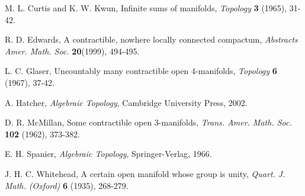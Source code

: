 \documentclass[12pt]{amsart}%
\theoremstyle{plain}
\numberwithin{equation}{section}
\begin{document}
\begin{thebibliography}{50}      

M. L. Curtis and K. W. Kwun, Infinite sums of manifolds, \textit{Topology} \textbf{3} (1965), 31-42.

R. D. Edwards, A contractible, nowhere locally connected compactum, \textit{Abstracts  Amer. Math. Soc.} \textbf{20}(1999), 494-495.

L. C. Glaser, Uncountably many contractible open 4-manifolds, \textit{Topology} \textbf{6} (1967), 37-42.

A. Hatcher, \textit{Algebraic Topology}, Cambridge University Press, 2002.

D. R. McMillan, Some contractible open 3-manifolds, \textit{Trans. Amer. Math. Soc.} \textbf{102} (1962), 373-382.

E. H. Spanier, \textit{Algebraic Topology}, Springer-Verlag, 1966.

J. H. C. Whitehead, A certain open manifold whose group is unity, \textit{Quart. J. Math. (Oxford)} \textbf{6} (1935), 268-279.

\end{thebibliography}
\end{document}
